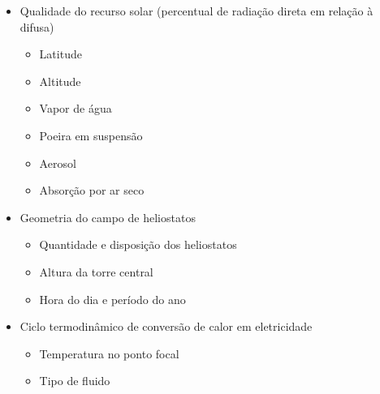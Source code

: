 \documentclass[12pt,notheorems,hyperref={pdfauthor=Professor Rafael Nardi}]{beamer}
\begin{document}
\begin{frame}%
	\begin{itemize}
		\item Qualidade do recurso solar (percentual de radiação direta em relação à difusa)
			\begin{itemize}
				\item Latitude
				\item Altitude
				\item Vapor de água
				\item Poeira em suspensão
				\item Aerosol
				\item Absorção por ar seco
			\end{itemize} \pause
			\bigskip
		\item Geometria do campo de heliostatos
			\begin{itemize}
				\item Quantidade e disposição dos heliostatos
				\item Altura da torre central
				\item Hora do dia e período do ano
			\end{itemize} \pause
			\bigskip
		\item Ciclo termodinâmico de conversão de calor em eletricidade
			\begin{itemize}
				\item Temperatura no ponto focal
				\item Tipo de fluido
			\end{itemize}
	\end{itemize}
\end{frame}
\end{document}
